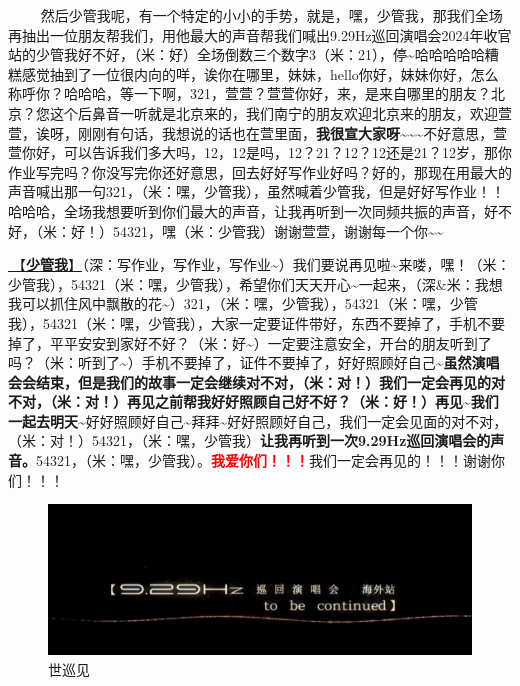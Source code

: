 \documentclass[]{ctexbook}
\begin{document}
   然后少管我呢，有一个特定的小小的手势，就是，嘿，少管我，那我们全场再抽出一位朋友帮我们，用他最大的声音帮我们喊出9.29Hz巡回演唱会2024年收官站的少管我好不好，（米：好）全场倒数三个数字3（米：21），停\textasciitilde 哈哈哈哈哈糟糕感觉抽到了一位很内向的咩，诶你在哪里，妹妹，hello你好，妹妹你好，怎么称呼你？哈哈哈，等一下啊，321，萱萱？萱萱你好，来，是来自哪里的朋友？北京？您这个后鼻音一听就是北京来的，我们南宁的朋友欢迎北京来的朋友，欢迎萱萱，诶呀，刚刚有句话，我想说的话也在萱里面，\textbf{我很宣大家呀\textasciitilde\textasciitilde\textasciitilde{}}不好意思，萱萱你好，可以告诉我们多大吗，12，12是吗，12？21？12？12还是21？12岁，那你作业写完吗？你没写完你还好意思，回去好好写作业好吗？好的，那现在用最大的声音喊出那一句321，（米：嘿，少管我），虽然喊着少管我，但是好好写作业！！哈哈哈，全场我想要听到你们最大的声音，让我再听到一次同频共振的声音，好不好，（米：好！）54321，嘿（米：少管我）谢谢萱萱，谢谢每一个你\textasciitilde\textasciitilde{}

\hyperref[watch-ur-manners]{🎵【\textbf{少管我}】}（深：写作业，写作业，写作业\textasciitilde）我们要说再见啦\textasciitilde 来喽，嘿！（米：少管我），54321（米：嘿，少管我），希望你们天天开心\textasciitilde 一起来，（深\&米：我想我可以抓住风中飘散的花\textasciitilde）321，（米：嘿，少管我），54321（米：嘿，少管我），54321（米：嘿，少管我），大家一定要证件带好，东西不要掉了，手机不要掉了，平平安安到家好不好？（米：好\textasciitilde）一定要注意安全，开台的朋友听到了吗？（米：听到了\textasciitilde）手机不要掉了，证件不要掉了，好好照顾好自己\textasciitilde{}\textbf{虽然演唱会会结束，但是我们的故事一定会继续对不对，（米：对！）我们一定会再见的对不对，（米：对！）再见之前帮我好好照顾自己好不好？（米：好！）再见\textasciitilde 我们一起去明天\textasciitilde{}}好好照顾好自己\textasciitilde 拜拜\textasciitilde 好好照顾好自己，我们一定会见面的对不对，（米：对！）54321，（米：嘿，少管我）\textbf{让我再听到一次9.29Hz巡回演唱会的声音。}54321，（米：嘿，少管我）。\textbf{\textcolor{red}{我爱你们！！！}}我们一定会再见的！！！谢谢你们！！！

\begin{figure}

{\centering \includegraphics[width=400pt]{img/nanning20241207/006} 

}

\caption{世巡见}\label{fig:unnamed-chunk-169}
\end{figure}
\end{document}
